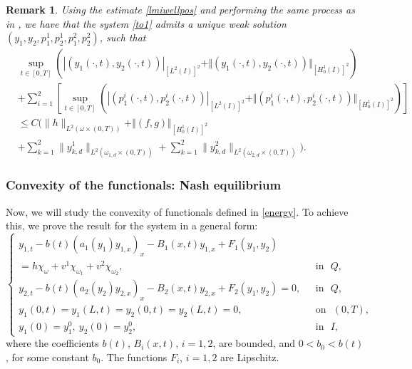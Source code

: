 \documentclass[11pt,a4paper]{amsart}
\numberwithin{equation}{section}
\newtheorem{remark}{Remark}[section]
\begin{document}
\begin{remark}\label{import_remark_1} Using the estimate \eqref{lmiwellpos}    and performing the same process as in  \cite{Nunez-Li2023}, we have that the system  \eqref{to1} admits a unique weak solution $(y_1, y_2, p_1^1, p_2^1,p_1^2, p_2^2)$, such that 
\begin{equation}\label{lmiwellpos_optimalsiste}
\begin{split}
&\sup_{t\in\left[0,T\right]} \left( |(y_1(\cdot, t),y_2(\cdot, t))|_{[L^2(I)]^2}+ \Vert (y_1(\cdot,t),y_2(\cdot,t))\Vert_{[H^1_0(I)]^2} \right) \\
 & +\sum^2_{i=1}\left[\sup_{t\in\left[0,T\right]} \left( |(p^{i}_1(\cdot, t),p^{i}_2(\cdot, t))|_{[L^2(I)]^2}+ \Vert (p^{i}_1(\cdot,t),p^{i}_2(\cdot,t))\Vert_{[H^1_0(I)]^2} \right)\right] \\
&\leq C\Big( \|h\|_{L^2(\omega \times (0,T))} + \Vert (f, g)\Vert_{[H^1_0(I)]^2} \\
&+ \sum_{k=1}^2 \|y_{k,d}^1\|_{L^2(\omega_{1,d}\times (0,T))} + \sum_{k=1}^2 \|y_{k,d}^2\|_{L^2(\omega_{2,d}\times (0,T))} \Big).
\end{split}
\end{equation}
\end{remark}

\subsubsection{Convexity of the functionals: Nash equilibrium}

Now, we will study the convexity of functionals defined in \eqref{energy}. To achieve this, we prove the result for the system in a general form:
\begin{equation}\label{eqprin544}
	\begin{cases}
		y_{1,t}-b(t)\left(a_1(y_{1})y_{1,x}\right)_x-B_1(x,t) y_{1,x}+F_1(y_1,y_2) \\
        ={h}\chi_{\omega}+{v}^1\chi_{\omega_1}+{v}^2\chi_{\omega_2}, & \ \ \ \text{in} \ \ \ {Q}, \\
		y_{2,t}-b(t)\left(a_2(y_{2})y_{2,x}\right)_x-B_2(x,t) y_{2,x}+F_2(y_1,y_2)=0, & \ \ \ \text{in} \ \ \ {Q},\\
		y_1(0,t)=y_1(L,t)=y_2(0,t)=y_2(L,t)=0, & \ \ \ \text{on} \ \ \ (0,T),\\
		y_1(0)=y_1^0, \ y_2(0)=y_2^0, & \ \ \ \text{in} \ \ \ I,
	\end{cases}
\end{equation}	
where the coefficients $b(t)$, $B_i(x,t)$, $i=1,2$, are bounded, and $0 < b_0 < b(t)$, for some constant $b_0$. The functions $F_i$, $i=1,2$ are Lipschitz.
\end{document}
